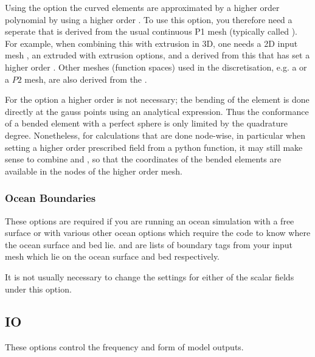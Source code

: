 Using the  option
the curved elements are approximated by a higher order polynomial by using a
higher order . To use this option, you therefore need a
seperate  that is derived from the usual continuous P1
mesh (typically called ). For example, when combining this with
extrusion in 3D, one needs a 2D input mesh , an extruded
 with extrusion options, and a  derived
from this that has set a higher order .
Other meshes (function spaces) used in the discretisation, e.g. a \PoDG or a $P2$ mesh, are
also derived from the .

For the  option a higher order
 is not necessary; the bending of the element is done
directly at the gauss points using an analytical expression. Thus the
conformance of a bended element with a perfect sphere is only limited by the
quadrature degree. Nonetheless, for calculations that are done node-wise, in
particular when setting a higher order prescribed field from a python
function, it may still make sense to combine 
and , so that the coordinates of the bended
elements are available in the nodes of the higher order mesh.

\subsubsection{Ocean Boundaries}\label{sec:ocean_boundaries}
These options are required if you are running an ocean simulation with a
free surface or with various other ocean options which require the code to
know where the ocean surface and bed lie.
 and
\onlypdf\linebreak{}
are lists of boundary tags from your input mesh which lie on the ocean
surface and bed respectively.

It is not usually necessary to change the settings for either of the scalar fields under this option. 

\subsection{IO}
These options control the frequency and form of model outputs.
